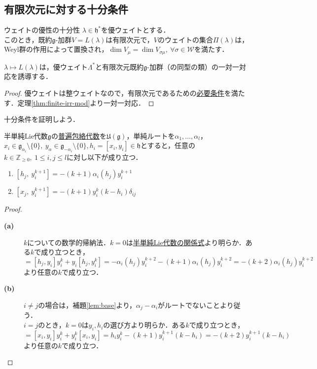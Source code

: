 \documentclass[rep_main]{subfiles}
\begin{document}
\subsection{有限次元に対する十分条件}
\begin{mytheo}[label=thm:suff-for-finite]{ウェイトの優性の十分性}
	$\lambda \in \mathfrak{h}^*$を優ウェイトとする．\\
	このとき，既約$\mathfrak{g}$-加群$V = L(\lambda)$は有限次元で，$V$のウェイトの集合$\Pi(\lambda)$は，Weyl群の作用によって置換され，$\dim V_\mu = \dim V_{\sigma\mu},\ \forall \sigma \in \mathscr{W}$を満たす．
\end{mytheo}
\begin{mycol}[label=col:suff-for-finite]{}
	$\lambda \mapsto L(\lambda)$は，優ウェイト$\Lambda^*$と有限次元既約$\mathfrak{g}$-加群（の同型の類）の一対一対応を誘導する．
\end{mycol}
\begin{proof}
	優ウェイトは整ウェイトなので，有限次元であるための\hyperref[thm:necessary-for-finite]{必要条件}を満たす．定理\ref{thm:finite-irr-mod}より一対一対応．
\end{proof}
十分条件を証明しよう．
\begin{mylem}[label=lem:suff-for-finite]{}
	半単純Lie代数$\mathfrak{g}$の\hyperref[def:univ-env-alg]{普遍包絡代数}を$\mathfrak{U}(\mathfrak{g})$，単純ルートを$\alpha_1, \ldots, \alpha_l$，$x_i \in \mathfrak{g}_{\alpha_i} \setminus \{0\},\ y_\alpha \in \mathfrak{g}_{-\alpha_i} \setminus \{0\}, h_i = [x_i, y_i] \in \mathfrak{h}$とすると，任意の$k \in \mathbb{Z}_{\geq 0},\ 1 \leq i, j \leq l$に対し以下が成り立つ．
	\begin{enumerate}
		\item $[h_j,\ y_i^{k+1}] = -(k+1)\alpha_i(h_j)y_i^{k+1}$
		\item $[x_j,\ y_i^{k+1}] = -(k+1)y_i^k(k - h_i)\delta_{ij}$
	\end{enumerate}
\end{mylem}
\begin{proof}
	\begin{description}
		\item[\textbf{(a)}] $k$についての数学的帰納法．$k=0$は\hyperref[prop:semisimple-Lie-alg-relation]{半単純Lie代数の関係式}より明らか．ある$k$で成り立つとき，
		\begin{equation}
			[h_j, y_i^{k+1}] = [h_j, y_i]y_i^k + y_i[h_j, y_i^k] = -\alpha_i(h_j)y_i^{k+2} - (k+1)\alpha_i(h_j)y_i^{k+2} = - (k+2)\alpha_i(h_j)y_i^{k+2}
		\end{equation}
		より任意の$k$で成り立つ．
		\item[\textbf{(b)}] $i \neq j$の場合は，補題\ref{lem:base}より，$\alpha_j - \alpha_i$がルートでないことより従う．\\
		$i = j$のとき，$k = 0$は$y_i, h_i$の選び方より明らか．ある$k$で成り立つとき，
		\begin{equation}
			[x_i, y_i^{k+1}] = [x_i, y_i]y_i^k + y_i^k[x_i, y_i] = h_iy_i^k - (k+1)y_i^{k+1}(k - h_i) = -(k+2)y_i^{k+1}(k - h_i)
		\end{equation}
		より任意の$k$で成り立つ．
	\end{description}
\end{proof}
\end{document}
